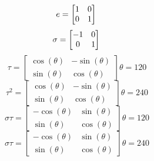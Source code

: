 \begin{example}
\begin{itemize}
        \[
        e = \begin{bmatrix}
            1 & 0\\
            0 & 1
            \end{bmatrix}\\
        \]\[
        \sigma = \begin{bmatrix}
            -1 & 0\\
            0 & 1
            \end{bmatrix}\\
        \]\[
        \tau = \begin{bmatrix}
            \cos(\theta) & -\sin(\theta)\\
            \sin(\theta) & \cos(\theta)
            \end{bmatrix}
        \theta=120
        \]\[
        \tau^2 = \begin{bmatrix}
            \cos(\theta) & -\sin(\theta)\\
            \sin(\theta) & \cos(\theta)
            \end{bmatrix}
        \theta=240
        \]\[
        \sigma\tau = \begin{bmatrix}
            -\cos(\theta) & \sin(\theta)\\
            \sin(\theta) & \cos(\theta)
            \end{bmatrix}
        \theta=120
        \]\[
        \sigma\tau = \begin{bmatrix}
            -\cos(\theta) & \sin(\theta)\\
            \sin(\theta) & \cos(\theta)
            \end{bmatrix}
        \theta=240
        \]
    \end{itemize}
\end{example}
